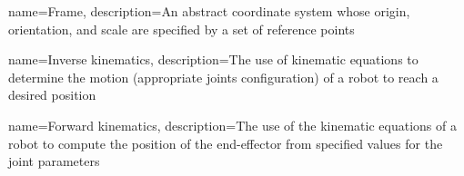 \makeglossaries

{
    name=Frame,
    description={An abstract coordinate system whose origin, orientation, and scale are specified by a set of reference points}
}

{
    name=Inverse kinematics,
    description={The use of kinematic equations to determine the motion (appropriate joints configuration) of a robot to reach a desired position}
}

{
    name=Forward kinematics,
    description={The use of the kinematic equations of a robot to compute the position of the end-effector from specified values for the joint parameters}
}